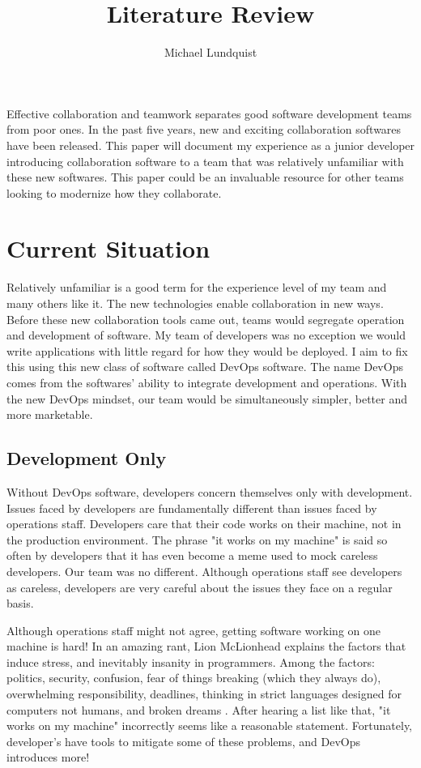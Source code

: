 \documentclass[titlepage]{article}
\author{Michael Lundquist}
\title{Literature Review}
\begin{document}
\maketitle

Effective collaboration and teamwork separates good software development teams from poor ones. In the past five years, new and exciting collaboration softwares have been released. This paper will document my experience as a junior developer introducing collaboration software to a team that was relatively unfamiliar with these new softwares. This paper could be an invaluable resource for other teams looking to modernize how they collaborate.


\section{Current Situation}

Relatively unfamiliar is a good term for the experience level of my team and many others like it. The new technologies enable collaboration in new ways. Before these new collaboration tools came out, teams would segregate operation and development of software. My team of developers was no exception we would write applications with little regard for how they would be deployed. I aim to fix this using this new class of software called DevOps software. The name DevOps comes from the softwares' ability to integrate development and operations. With the new DevOps mindset, our team would be simultaneously simpler, better and more marketable.

\subsection{Development Only}

Without DevOps software, developers concern themselves only with development. Issues faced by developers are fundamentally different than issues faced by operations staff. Developers care that their code works on their machine, not in the production environment. The phrase "it works on my machine" is said so often by developers that it has even become a meme used to mock careless developers. Our team was no different. Although operations staff see developers as careless, developers are very careful about the issues they face on a regular basis. 

Although operations staff might not agree, getting software working on one machine is hard! In an amazing rant, Lion McLionhead explains the factors that induce stress, and inevitably insanity in programmers. Among the factors: politics, security, confusion, fear of things breaking (which they always do), overwhelming responsibility, deadlines, thinking in strict languages designed for computers not humans, and broken dreams \cite{Lion.2014}. After hearing a list like that, "it works on my machine" incorrectly seems like a reasonable statement. Fortunately, developer's have tools to mitigate some of these problems, and DevOps introduces more! 
\end{document}
